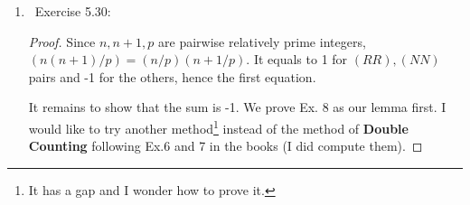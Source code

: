 \documentclass[11pt]{article}
\newcommand\0{\mathbf{0}}
\newcommand\ZZ{\mathbb{Z}}
\newcommand\<{\langle}
\renewcommand\>{\rangle}
\renewcommand\mod[1]{\ (\mathrm{mod}\ #1)}
\begin{document}
\begin{enumerate}
\begin{proof}
  We can first without any effort conduct the total counting:
  \begin{align}
    p-2 = (RR) + (NR) +(RN) +(NN).
  \end{align}
  Then, since 1 is always a quadratic residue and $(-1/p) \equiv (-1)^{(p-1)/2} \mod{p},$ the numbers of each pair depend on the residue of $p$ modulo 4. From another perspective, if we add $(p-1, 1)$ into these $(p-2)$ pairs and complete the cycle in $U(\ZZ_p)$, then we obtain exactly:
  \begin{align*}
    (RR) + (RN) = (NR) + (NN) = (RR) + (NR) = (RN) + (NN) = \frac{p-1}{2}.
  \end{align*}
  Thus, we only need to exam which type $(p-1,1)$ falls into and then cancel it out.
\begin{itemize}
  \item When $p\equiv 3\mod{4},$ we compute $(-1/p)\equiv (-1)^{(p-1)/2} \equiv -1 \mod{p}$. Therefore, the  $(p-1, 1) = (NR)$.
  \begin{align*}
    (RR) + (RN) &= \frac{p-1}{2},\\
    (NR) + (NN) &= \frac{p-1}{2} -1, \\
    (RR) + (NR) &= \frac{p-1}{2} -1, \\
    (RN) + (NN) &= \frac{p-1}{2}.\\
  \end{align*}
  \item When $p\equiv 1\mod{4},$ we compute $(-1/p)\equiv 1 \mod{p}$. In this case, the $(p-1, 1) = (RR)$.
  \begin{align*}
    (RR) + (RN) &= \frac{p-1}{2} -1, \\
    (NR) + (NN) &= \frac{p-1}{2}, \\
    (RR) + (NR) &= \frac{p-1}{2} -1, \\
    (RN) + (NN) &= \frac{p-1}{2}. \\
  \end{align*}
\end{itemize}
\end{proof}
\item\ 
Exercise 5.30:
\begin{proof}
Since $n, n+1, p$ are pairwise relatively prime integers, $(n(n+1)/p) = (n/p)({n+1}/p)$. It equals to 1 for $(RR), (NN)$ pairs and -1 for the others, hence the first equation.

It remains to show that the sum is -1. We prove Ex. 8 as our lemma first. I would like to try another method\footnote[1]{It has a gap and I wonder how to prove it.} instead of the method of \textbf{Double Counting} following Ex.6 and 7 in the books (I did compute them).


\end{proof}
\end{enumerate}
\end{document}
